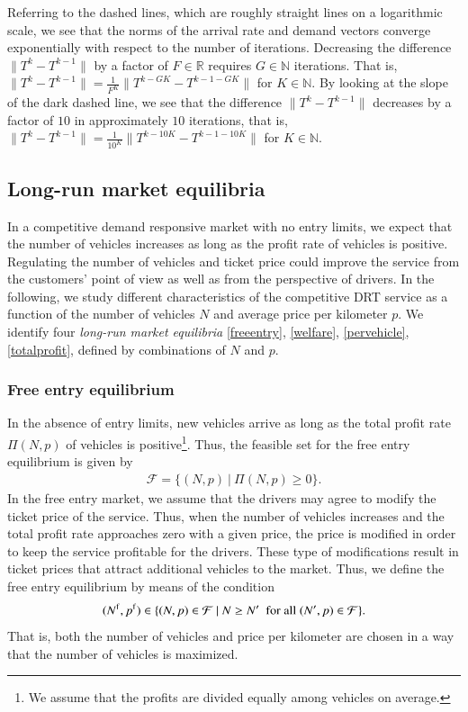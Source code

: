 \documentclass[dissertation,draft*]{aaltoseries}
\begin{document}
Referring to the dashed lines, which are roughly straight lines on a logarithmic scale, 
we see that the norms of the arrival rate and demand vectors converge exponentially
with respect to the number of iterations. Decreasing the difference $\|T^k -T^{k-1}\|$ by a factor of $F \in \mathbb{R}$
requires $G \in \mathbb{N}$ iterations. That is, $\|T^k -T^{k-1}\| = \frac{1}{F^K} \|T^{k-GK} -T^{k-1-GK}\|$
for $K \in \mathbb{N}$.
By looking at the slope of the dark dashed line, we see that the 
difference $\|T^k -T^{k-1}\|$ decreases 
by a factor of $10$ in approximately $10$ iterations, that is, $\|T^k -T^{k-1}\| = \frac {1}{10^K} \|T^{k-10K} -T^{k-1-10K}\|$
for $K \in \mathbb{N}$.


\subsection{Long-run market equilibria}
\label{longrun}
In a competitive demand responsive market with no entry limits, 
we expect that the number of vehicles increases as long as the profit
rate of vehicles is positive. 
Regulating the number of vehicles and ticket price could improve the service
from the customers' point of view as well as from the perspective of drivers.
In the following, we study different characteristics of the competitive DRT service 
as a function of the number of vehicles $N$ and average price per kilometer $p$.
We identify four \emph{long-run market equilibria} \eqref{freeentry}, \eqref{welfare},
\eqref{pervehicle}, \eqref{totalprofit}, defined by combinations of $N$ and $p$.

\subsubsection{Free entry equilibrium}
In the absence of entry limits, new vehicles arrive as long as 
the total profit rate $\Pi(N,p)$ of vehicles is positive\footnote{We assume that the profits are 
divided equally among vehicles on average.}. 
Thus, the feasible set for the free entry equilibrium is given by
\begin{align}
\mathcal{F} = \{(N,p) \ | \ \Pi(N,p) \geq 0 \}.
\end{align}
In the free entry market, we assume that the drivers may agree to modify the ticket price of the service.
Thus, when the number of vehicles increases and the total profit rate approaches zero with a given 
price, the price is modified in order to keep the service profitable for the drivers.
These type of modifications result in ticket prices that attract additional vehicles to the market.
Thus, we define the free entry equilibrium by means of the condition
\begin{align}
\label{freeentry}
(N^{\rm f},p^{\rm f}) \in \{ (N,p) \in \mathcal{F} \ | \ N \geq N' \ \mbox{ for all } (N',p) \in \mathcal{F} \}.
\end{align}
That is, both the number of vehicles and price per kilometer are chosen in a way that the 
number of vehicles is maximized.
\end{document}
